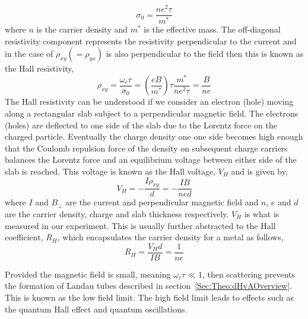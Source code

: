 \begin{equation}
    \sigma_0 = \frac{ne^2\tau}{m^*}
\end{equation}
where $n$ is the carrier density and $m^*$ is the effective mass. The off-diagonal resistivity component represents the resistivity perpendicular to the current and in the case of $\rho_{xy} (=\rho_{yx})$ is also perpendicular to the field then this is known as the Hall resistivity,
 \begin{equation}
     \rho_{xy} = \frac{\omega_c \tau}{\sigma_0} = \left(\frac{eB}{m^*}\right)\tau\frac{m^*}{ne^2\tau} = \frac{B}{ne}
 \end{equation}
The Hall resistivity can be understood if we consider an electron (hole) moving along a rectangular slab subject to a perpendicular magnetic field. The electrons (holes) are deflected to one side of the slab due to the Lorentz force on the charged particle. Eventually the charge density one one side becomes high enough that the Coulomb repulsion force of the density on subsequent charge carriers balances the Lorentz force and an equilibrium voltage between either side of the slab is reached. This voltage is known as the Hall voltage, $V_H$ and is given by,
\begin{equation}
    V_H = -\frac{I\rho_{xy}}{d} = -\frac{IB}{ned}
\end{equation}
where $I$ and $B_{\perp}$ are the current and perpendicular magnetic field and $n$, $e$ and $d$ are the carrier density, charge and slab thickness respectively. $V_H$ is what is measured in our experiment. This is usually further abstracted to the Hall coefficient, $R_H$, which encapsulates the carrier density for a metal as follows,
\begin{equation}
    R_H = \frac{V_H d}{IB} = \frac{1}{ne}
\end{equation}

Provided the magnetic field is small, meaning $\omega_c \tau \ll 1$, then scattering prevents the formation of Landau tubes described in section~\ref{Sec:Theo:dHvAOverview}. This is known as the low field limit. The high field limit leads to effects such as the quantum Hall effect and quantum oscillations.

% 


